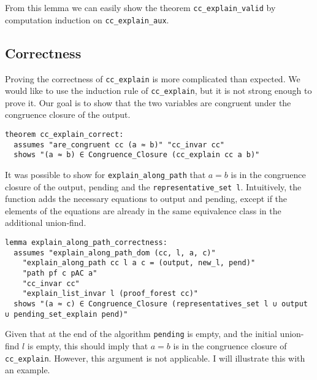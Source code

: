 From this lemma we can easily show the theorem \lstinline{cc_explain_valid} by computation induction on \lstinline{cc_explain_aux}.

\subsection{Correctness}

Proving the correctness of \lstinline{cc_explain} is more complicated than expected. We would like to use the induction rule of \lstinline{cc_explain}, but it is not strong enough to prove it. Our goal is to show that the two variables are congruent under the congruence closure of the output.

\begin{lstlisting}
theorem cc_explain_correct:
  assumes "are_congruent cc (a ≈ b)" "cc_invar cc"
  shows "(a ≈ b) ∈ Congruence_Closure (cc_explain cc a b)"
\end{lstlisting}

It was possible to show for \lstinline{explain_along_path} that $a = b$ is in the congruence closure of the output, pending and the \lstinline{representative_set l}. Intuitively, the function adds the necessary equations to output and pending, except if the elements of the equations are already in the same equivalence class in the additional union-find.

\begin{lstlisting}
lemma explain_along_path_correctness:
  assumes "explain_along_path_dom (cc, l, a, c)"
    "explain_along_path cc l a c = (output, new_l, pend)"
    "path pf c pAC a"
    "cc_invar cc"
    "explain_list_invar l (proof_forest cc)"
  shows "(a ≈ c) ∈ Congruence_Closure (representatives_set l ∪ output
∪ pending_set_explain pend)"
\end{lstlisting}

Given that at the end of the algorithm \lstinline{pending} is empty, and the initial union-find $l$ is empty, this should imply that $a = b$ is in the congruence closure of \lstinline{cc_explain}.
However, this argument is not applicable. I will illustrate this with an example.

